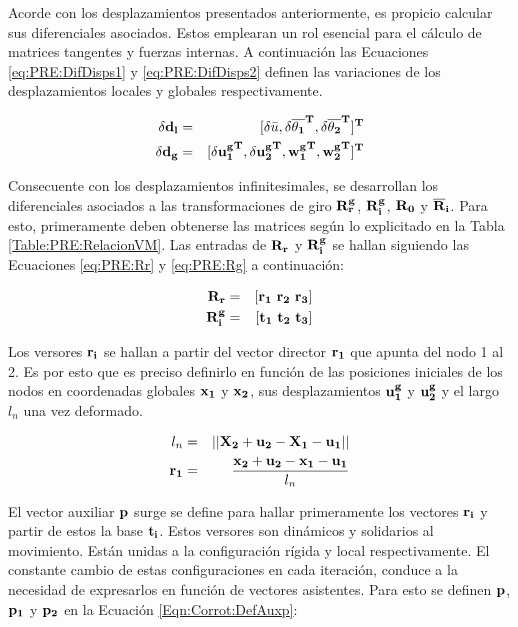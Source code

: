 Acorde con los desplazamientos presentados anteriormente, es propicio calcular sus diferenciales asociados. Estos emplearan un rol esencial para el cálculo de matrices tangentes y fuerzas internas. A continuación las Ecuaciones \eqref{eq:PRE:DifDisps1} y \eqref{eq:PRE:DifDisps2}
definen las variaciones de los desplazamientos locales y globales respectivamente. 

\begin{eqnarray}\label{eq:PRE:DifDisps1}
		\bf{\delta d_l} &=& [\delta\bar{u}, \bf{\delta\overline{ \theta _1}^T},	\bf{\delta \overline{ \theta _2}^T}]^T\\
	\label{eq:PRE:DifDisps2}
	\bf{\delta d_g} &=& [\bf{\delta u_1^g}^T, \bf{\delta u_2^g}^T, \bf{{w_1^g}^T}, \bf{{w_2^g}^T}]^T
\end{eqnarray}

Consecuente con los desplazamientos infinitesimales, se desarrollan los diferenciales asociados a las transformaciones de giro $\bf{R_r^g}$, $\bf{R_i^g}$, $\bf{R_0}$ y $\bf{\overline{R}}_i$.
Para esto, primeramente deben obtenerse las matrices según lo explicitado en la Tabla \ref{Table:PRE:RelacionVM}. Las entradas de $\bf{R}_r$ y  $\bf{R}_i^g$ se hallan siguiendo las Ecuaciones \eqref{eq:PRE:Rr} y \eqref{eq:PRE:Rg} a continuación:

\begin{eqnarray}
	\label{eq:PRE:Rr}
	\bf{R_r}&=&[\bf{r_1} ~ \bf{r_2} ~ \bf{r_3}]\\
	\label{eq:PRE:Rg}
	\bf{R}_i^g&=&[\bf{t_1} ~ \bf{t_2} ~ \bf{t_3}]
\end{eqnarray}

 Los versores $\bf{r_i}$  se hallan a partir del vector director $\bf{r_1}$ que apunta del nodo 1 al 2. Es por esto que es preciso definirlo en función de las posiciones iniciales de los nodos en coordenadas globales $\bf{x}_1$ y $\bf{x}_2$, sus desplazamientos $\bf{u}_1^g$ y $\bf{u}_2^g$ y el largo $l_n$ una vez deformado.

\begin{eqnarray}
	l_n&=& ||\bf{X}_2+\bf{u}_2-\bf{X}_1-\bf{u}_1||\\
	\bf{r_1}&=&\frac{\bf{x}_2+\bf{u}_2-\bf{x}_1-\bf{u}_1}{l_n}
\end{eqnarray}

El vector auxiliar $\bf{p}$ surge se define para hallar primeramente los vectores $\bf{r}_i$ y partir de estos la base $\bf{t}_i$. Estos versores son dinámicos y solidarios al movimiento. Están unidas a la configuración rígida y local respectivamente. El constante cambio de estas configuraciones en cada iteración, conduce a la necesidad de expresarlos en función de vectores asistentes.  Para esto se definen 
$\bf{p}$, $\bf{p_1}$ y $\bf{p_2}$ en la Ecuación \eqref{Eqn:Corrot:DefAuxp}:

